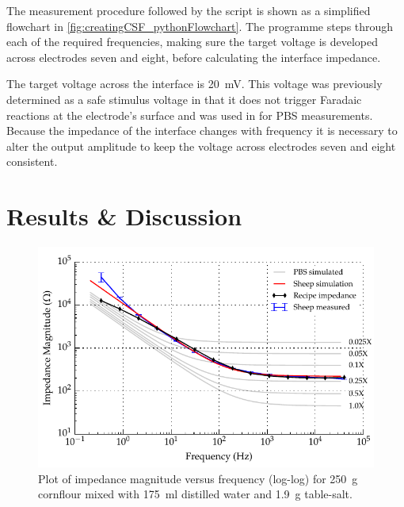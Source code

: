   The measurement procedure followed by the script is shown as a simplified flowchart in \cref{fig:creatingCSF_pythonFlowchart}.
  The programme steps through each of the required frequencies, making sure the target voltage is developed across electrodes seven and eight, before calculating the interface impedance.

  The target voltage across the interface is \SI{20}{\milli\volt}.
  This voltage was previously determined as a safe stimulus voltage in that it does not trigger Faradaic reactions at the electrode's surface and was used in for PBS measurements.
  Because the impedance of the interface changes with frequency it is necessary to alter the output amplitude to keep the voltage across electrodes seven and eight consistent.


\section{Results \& Discussion}

  \begin{figure}
    \centering
    \includegraphics[width=\textwidth]{content/pt2/graphics/run14_175ml-distilledWater_250g-cornflour_1g9-salt_ZVsF_graph_mag}
    \caption{\label{fig:recipe_cornflour_salt_mag}Plot of impedance magnitude versus frequency (log-log) for \SI{250}{\gram} cornflour mixed with \SI{175}{\milli\litre} distilled water and \SI{1.9}{\gram} table-salt.}
  \end{figure}

